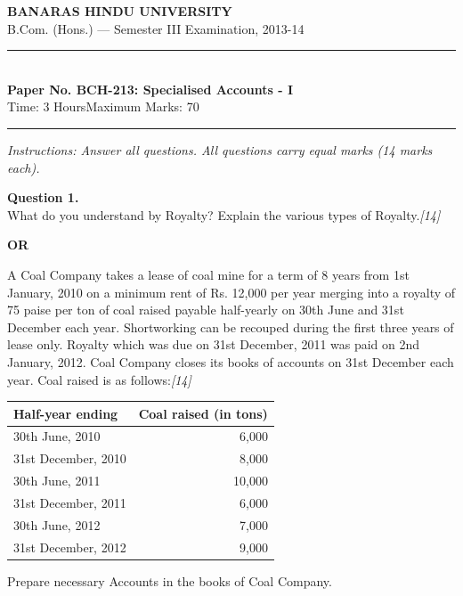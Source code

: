 \documentclass[11pt,a4paper]{article}
\newcommand{\pts}[1]{\hfill   \textit{[#1]}}
\begin{document}
\begin{center}
  {\large\bfseries BANARAS HINDU UNIVERSITY}\\[2pt]
  {\normalsize B.Com. (Hons.) --- Semester III Examination, 2013-14}\\[6pt]
  \rule{0.8\linewidth}{0.5pt}\\[6pt]
  {\large\bfseries Paper No. BCH-213: Specialised Accounts - I}\\[4pt]
  {\normalsize Time: 3 Hours\hfill Maximum Marks: 70}
\end{center}

\rule{\linewidth}{0.4pt}

\smallskip



\noindent   \textit{Instructions: Answer all questions. All questions carry equal marks (14 marks each).}

\bigskip




\noindent   \textbf{Question 1.} \\
What do you understand by Royalty? Explain the various types of Royalty.\pts{14}

\centerline{   \textbf{OR}}

A Coal Company takes a lease of coal mine for a term of 8 years from 1st January, 2010 on a minimum rent of Rs. 12,000 per year merging into a royalty of 75 paise per ton of coal raised payable half-yearly on 30th June and 31st December each year. Shortworking can be recouped during the first three years of lease only. Royalty which was due on 31st December, 2011 was paid on 2nd January, 2012. Coal Company closes its books of accounts on 31st December each year. Coal raised is as follows:\pts{14}

\begin{center}
\renewcommand{\arraystretch}{1.2}

\begin{tabular}{|l|r|}
\hline
   \textbf{Half-year ending} &   \textbf{Coal raised (in tons)} \\ \hline
30th June, 2010 & 6,000 \\
31st December, 2010 & 8,000 \\
30th June, 2011 & 10,000 \\
31st December, 2011 & 6,000 \\
30th June, 2012 & 7,000 \\
31st December, 2012 & 9,000 \\ \hline
\end{tabular}
\end{center}
Prepare necessary Accounts in the books of Coal Company.
\end{document}
